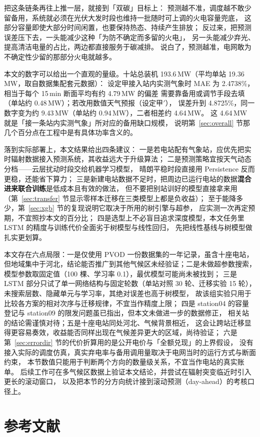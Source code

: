 \documentclass[11pt,a4paper]{ctexart}
\begin{document}
把这条链条再往上推一层，就接到「双碳」目标上：
预测越不准，调度越不敢少留备用，系统就必须在光伏大发时段也维持一批随时可上调的火电容量兜底，
这部分容量即使大部分时间闲置，也要保持热态、持续产生排放；
反过来，把预测误差压下去，一头能减少这种「为防不确定而多留的火电」，
另一头能减少弃光、提高清洁电量的占比，两边都直接服务于碳减排。
说白了，预测越准，电网敢为不确定性少留的那部分火电就越多。

本文的数字可以给出一个直观的量级。十站总装机 193.6\,MW（平均单站 19.36\,MW，取自数据集配套元数据）：
设定甲接入站内实测气象时 MAE 为 2.4738\%，相当于每个 15\,min 断面平均有约 4.79\,MW 的偏差
需要靠备用或调节手段去填（单站约 0.48\,MW）；若改用数值天气预报（设定甲$'$），
误差升到 4.8725\%，同一数字变为约 9.43\,MW（单站约 0.94\,MW），二者相差约 4.64\,MW。
这 4.64\,MW 就是「接一条站内实测气象」所对应的备用缺口规模，
说明第~\ref{sec:overall} 节那几个百分点在工程中是有具体功率含义的。

落到实际部署上，本文结果给出四条建议：
一是若电站配有气象站，应优先把实时辐射数据接入预测系统，其收益远大于升级算法；
二是预测策略宜按天气动态分档——云层扰动时段交给机器学习模型，
晴朗平稳时段直接用 Persistence 反而更稳，还能省下算力；
三是新建电站数据不足时，把周边已运行电站的数据\textbf{混合进来联合训练}是低成本且有效的做法，
但不要把别站训好的模型直接拿来用（第~\ref{sec:transfer} 节显示零样本迁移在三类模型上都是负收益）；
至于能降多少，第~\ref{sec:xgb} 节的复现说明它取决于所用的树引擎与超参，
应实测一次再定预期，不宜照抄本文的百分比；
四是选型上不必盲目追求深度模型，本文任务里 LSTM 的精度与训练代价全面劣于树模型与线性回归，
先把线性基线与树模型做扎实更划算。

本文存在六点局限：一是仅使用 PVOD 一份数据集的一年记录，虽含十座电站，
但地域集中于河北，结论能否推广到其他气候区未经验证；二是未做超参数搜索，
模型参数取固定值（100 棵、学习率 0.1），最优模型可能尚未被找到；
三是 LSTM 部分只试了单一网络结构与固定轮数（单站对照 30 轮、迁移实验 15 轮），
未搜索层数、隐藏单元与学习率，其绝对误差也高于树模型，
故该组实验只用于比较各方案的相对次序与迁移规律，不宜当作精度上限；
四是 station04 的容量登记与 station09 的限发问题虽已指出，但本文未做进一步的数据修正，
相关站的结论需谨慎对待；五是十座电站同处河北、气候背景相近，
这会让跨站迁移显得更容易奏效，收益能否同样出现在气候差异更大的区域，尚待验证；
六是第~\ref{sec:errordir} 节的代价折算用的是公开电价与「全额兑现」的上界假设，
没有接入实际的调度仿真，真实弃电率与备用调用量取决于电网当时的运行方式与断面约束，
本节数值只能用于判断两个方向的数量级关系，不宜当作电站的真实账单。
后续工作可在多气候区数据上验证本文结论，并尝试在辐射突变临近时引入更长的滚动窗口，
以及把本节的分方向统计接到滚动预测（day-ahead）的考核口径上。

\section*{参考文献}

\end{document}
